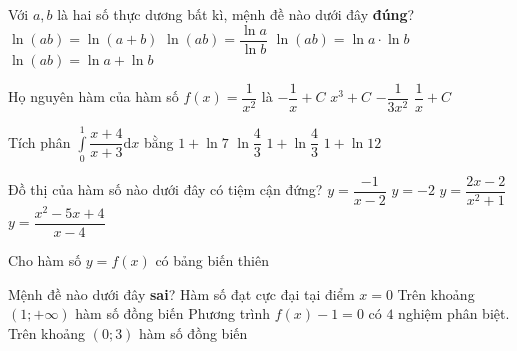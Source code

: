 \begin{ex}%
Với $a ,b$ là hai số thực dương bất kì, mệnh đề nào dưới đây \textbf{đúng}?
\choice
{$\ln(ab)=\ln (a+b)$}
{$\ln(ab)=\dfrac{\ln a}{\ln b}$}
{$\ln(ab)=\ln a \cdot \ln b$}
{\True $\ln(ab)=\ln a +\ln b$}
\end{ex}

\begin{ex}%
Họ nguyên hàm của hàm số $f(x) =\dfrac{1}{x^2}$ là
\choice
{\True $-\dfrac{1}{x}+C$}
{$x^3+C$}
{$-\dfrac{1}{3x^2}$}
{$\dfrac{1}{x}+C$}
\end{ex}

\begin{ex}%
Tích phân $\displaystyle \int\limits_{0}^{1} \dfrac{x+4}{x+3} \mathrm{d}x$ bằng
\choice
{$1+\ln 7$}
{$\ln \dfrac{4}{3}$}
{\True $1+\ln \dfrac{4}{3}$}
{$1+\ln 12$}
\end{ex}

\begin{ex}%
Đồ thị của hàm số nào dưới đây có tiệm cận đứng?
\choice
{\True $y=\dfrac{-1}{x-2}$}
{$y=-2$}
{$y=\dfrac{2x-2}{x^2+1}$}
{$y=\dfrac{x^2-5x+4}{x-4}$}
\end{ex}

\begin{ex}%
Cho hàm số $y=f(x)$ có bảng biến thiên
\begin{center}
\end{center}
Mệnh đề nào dưới đây  \textbf{sai}?
\choice
{Hàm số đạt cực đại tại điểm $x=0$}
{Trên khoảng $(1;+\infty)$ hàm số đồng biến}
{Phương trình $f(x)-1=0$ có $4$ nghiệm phân biệt.}
{\True Trên khoảng $(0;3)$ hàm số đồng biến}
\end{ex}

